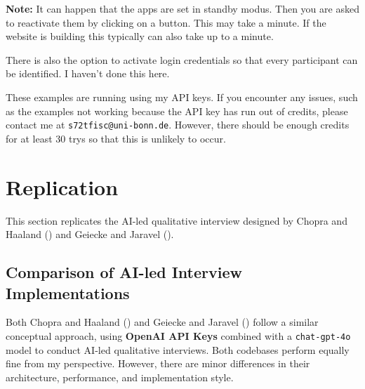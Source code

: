 \documentclass[
  letterpaper,
  DIV=11,
  numbers=noendperiod]{scrartcl}
\begin{document}
\textbf{Note:} It can happen that the apps are set in standby modus.
Then you are asked to reactivate them by clicking on a button. This may
take a minute. If the website is building this typically can also take
up to a minute.

There is also the option to activate login credentials so that every
participant can be identified. I haven't done this here.

These examples are running using my API keys. If you encounter any
issues, such as the examples not working because the API key has run out
of credits, please contact me at \texttt{s72tfisc@uni-bonn.de}. However,
there should be enough credits for at least 30 trys so that this is
unlikely to occur.

\section{Replication}\label{sec-replication}

This section replicates the AI-led qualitative interview designed by
Chopra and Haaland () and
Geiecke and Jaravel ().

\subsection{Comparison of AI-led Interview
Implementations}\label{comparison-of-ai-led-interview-implementations}

Both Chopra and Haaland () and
Geiecke and Jaravel () follow a
similar conceptual approach, using \textbf{OpenAI API Keys} combined
with a \texttt{chat-gpt-4o} model to conduct AI-led qualitative
interviews. Both codebases perform equally fine from my perspective.
However, there are minor differences in their architecture, performance,
and implementation style.
\end{document}
